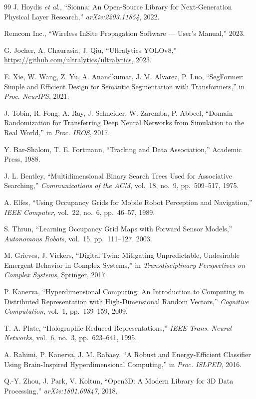\documentclass[12pt,a4paper,titlepage]{article}
\begin{document}
\begin{thebibliography}{99}
J. Hoydis \textit{et al.},
``Sionna: An Open-Source Library for Next-Generation Physical Layer Research,''
\textit{arXiv:2203.11854}, 2022.

Remcom Inc.,
``Wireless InSite Propagation Software --- User's Manual,'' 2023.

G. Jocher, A. Chaurasia, J. Qiu,
``Ultralytics YOLOv8,''
\url{https://github.com/ultralytics/ultralytics}, 2023.

E. Xie, W. Wang, Z. Yu, A. Anandkumar, J. M. Alvarez, P. Luo,
``SegFormer: Simple and Efficient Design for Semantic Segmentation with Transformers,''
in \textit{Proc. NeurIPS}, 2021.

J. Tobin, R. Fong, A. Ray, J. Schneider, W. Zaremba, P. Abbeel,
``Domain Randomization for Transferring Deep Neural Networks from Simulation to the Real World,''
in \textit{Proc. IROS}, 2017.

Y. Bar-Shalom, T. E. Fortmann,
``Tracking and Data Association,''
Academic Press, 1988.

J. L. Bentley,
``Multidimensional Binary Search Trees Used for Associative Searching,''
\textit{Communications of the ACM}, vol.~18, no.~9, pp.~509--517, 1975.

A. Elfes,
``Using Occupancy Grids for Mobile Robot Perception and Navigation,''
\textit{IEEE Computer}, vol.~22, no.~6, pp.~46--57, 1989.

S. Thrun,
``Learning Occupancy Grid Maps with Forward Sensor Models,''
\textit{Autonomous Robots}, vol.~15, pp.~111--127, 2003.

M. Grieves, J. Vickers,
``Digital Twin: Mitigating Unpredictable, Undesirable Emergent Behavior in Complex Systems,''
in \textit{Transdisciplinary Perspectives on Complex Systems}, Springer, 2017.

P. Kanerva,
``Hyperdimensional Computing: An Introduction to Computing in Distributed Representation with High-Dimensional Random Vectors,''
\textit{Cognitive Computation}, vol.~1, pp.~139--159, 2009.

T. A. Plate,
``Holographic Reduced Representations,''
\textit{IEEE Trans. Neural Networks}, vol.~6, no.~3, pp.~623--641, 1995.

A. Rahimi, P. Kanerva, J. M. Rabaey,
``A Robust and Energy-Efficient Classifier Using Brain-Inspired Hyperdimensional Computing,''
in \textit{Proc. ISLPED}, 2016.

Q.-Y. Zhou, J. Park, V. Koltun,
``Open3D: A Modern Library for 3D Data Processing,''
\textit{arXiv:1801.09847}, 2018.

\end{thebibliography}
\end{document}

